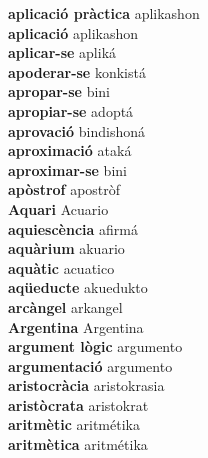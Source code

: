 \textbf{ aplicació pràctica  } aplikashon \\
\textbf{ aplicació  } aplikashon \\
\textbf{ aplicar-se  } apliká \\
\textbf{ apoderar-se  } konkistá \\
\textbf{ apropar-se  } bini \\
\textbf{ apropiar-se  } adoptá \\
\textbf{ aprovació  } bindishoná \\
\textbf{ aproximació  } ataká \\
\textbf{ aproximar-se  } bini \\
\textbf{ apòstrof  } apostròf \\
\textbf{ Aquari  } Acuario \\
\textbf{ aquiescència  } afirmá \\
\textbf{ aquàrium  } akuario \\
\textbf{ aquàtic  } acuatico \\
\textbf{ aqüeducte  } akuedukto \\
\textbf{ arcàngel  } arkangel \\
\textbf{ Argentina  } Argentina \\
\textbf{ argument lògic  } argumento \\
\textbf{ argumentació  } argumento \\
\textbf{ aristocràcia  } aristokrasia \\
\textbf{ aristòcrata  } aristokrat \\
\textbf{ aritmètic  } aritmétika \\
\textbf{ aritmètica  } aritmétika \\
